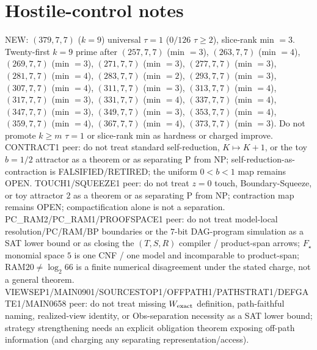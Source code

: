 \documentclass[11pt]{article}
\begin{document}
\section*{Hostile-control notes}
NEW: $(379,7,7)$ ($k{=}9$) universal $\tau{=}1$ ($0/126$ $\tau{\ge}2$), slice-rank min $=3$.
Twenty-first $k{=}9$ prime after $(257,7,7)$ (min $=3$), $(263,7,7)$ (min $=4$), $(269,7,7)$ (min $=3$), $(271,7,7)$ (min $=3$), $(277,7,7)$ (min $=3$), $(281,7,7)$ (min $=4$), $(283,7,7)$ (min $=2$), $(293,7,7)$ (min $=3$), $(307,7,7)$ (min $=4$), $(311,7,7)$ (min $=3$), $(313,7,7)$ (min $=4$), $(317,7,7)$ (min $=3$), $(331,7,7)$ (min $=4$), $(337,7,7)$ (min $=4$), $(347,7,7)$ (min $=3$), $(349,7,7)$ (min $=3$), $(353,7,7)$ (min $=4$), $(359,7,7)$ (min $=4$), $(367,7,7)$ (min $=4$), $(373,7,7)$ (min $=3$).
Do not promote $k{\ge}m$ $\tau{=}1$ or slice-rank min as hardness or charged improve.
CONTRACT1 peer: do not treat standard self-reduction, $K\mapsto K+1$, or the toy $b{=}1/2$ attractor as a theorem or as separating P from NP;
self-reduction-as-contraction is FALSIFIED/RETIRED; the uniform $0{<}b{<}1$ map remains OPEN.
TOUCH1/SQUEEZE1 peer: do not treat $z{=}0$ touch, Boundary-Squeeze, or toy attractor $2$ as a theorem or as separating P from NP;
contraction map remains OPEN; compactification alone is not a separation.
PC\_RAM2/PC\_RAM1/PROOFSPACE1 peer: do not treat model-local resolution/PC/RAM/BP boundaries or the $7$-bit DAG-program simulation as a SAT lower bound
or as closing the $(T,S,R)$ compiler / product-span arrows; $F_\star$ monomial space $5$ is one CNF / one model and incomparable to product-span;
RAM$20\neq\log_2 66$ is a finite numerical disagreement under the stated charge, not a general theorem.
VIEWSEP1/MAIN0901/SOURCESTOP1/OFFPATH1/PATHSTRAT1/DEFGATE1/MAIN0658 peer: do not treat missing $W_{\rm exact}$ definition,
path-faithful naming, realized-view identity, or Obs-separation necessity as a SAT lower bound;
strategy strengthening needs an explicit obligation theorem exposing off-path information
(and charging any separating representation/access).
\end{document}
